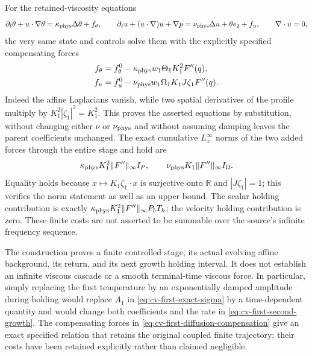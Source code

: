For the retained-viscosity equations
\[
 \partial_t\theta+u\cdot\nabla\theta
     =\kappa_{\rm phys}\Delta\theta+f_\theta,\qquad
 \partial_tu+(u\cdot\nabla)u+\nabla p
     =\nu_{\rm phys}\Delta u+\theta e_2+f_u,
 \qquad\nabla\cdot u=0,
\]
the very same state and controls solve them with the explicitly
specified compensating forces
\begin{align}
 f_\theta&=f_\theta^0
 -\kappa_{\rm phys}w_1\Theta_1K_1^2F''(q),\nonumber\\
 f_u&=f_u^0-\nu_{\rm phys}w_1\Omega_1K_1J\zeta_1F''(q).
 \label{eq:cv-first-diffusion-compensation}
\end{align}
Indeed the affine Laplacians vanish, while two spatial derivatives
of the profile multiply by $K_1^2|\zeta_1|^2=K_1^2$.
This proves the asserted equations by substitution, without changing
either $\nu$ or $\nu_{\rm phys}$ and without assuming damping leaves
the parent coefficients unchanged. The exact cumulative $L^\infty_x$
norms of the two added forces through the entire stage and hold are
\begin{equation}
 \kappa_{\rm phys}K_1^2\|F''\|_\infty I_P,
 \qquad
 \nu_{\rm phys}K_1\|F''\|_\infty I_\Omega.
 \label{eq:cv-first-exact-diffusion-cost}
\end{equation}
Equality holds because $x\mapsto K_1\zeta_1\cdot x$ is surjective
onto $\mathbb R$ and $|J\zeta_1|=1$; this verifies the norm statement
as well as an upper bound. The scalar holding contribution is exactly
$\kappa_{\rm phys}K_1^2\|F''\|_\infty P_bT_h$; the velocity holding
contribution is zero. These finite costs are not asserted to be
summable over the source's infinite frequency sequence.

The construction proves a finite controlled stage, its actual evolving
affine background, its return, and its next growth holding interval.
It does not establish an infinite viscous cascade or a smooth
terminal-time viscous force. In particular, simply replacing the
first temperature by an exponentially damped amplitude during holding
would replace $A_1$ in \eqref{eq:cv-first-exact-sigma} by a
time-dependent quantity and would change both coefficients and the
rate in \eqref{eq:cv-first-second-growth}. The compensating forces
in \eqref{eq:cv-first-diffusion-compensation} give an exact specified
relation that retains the original coupled finite trajectory; their
costs have been retained explicitly rather than claimed negligible.
